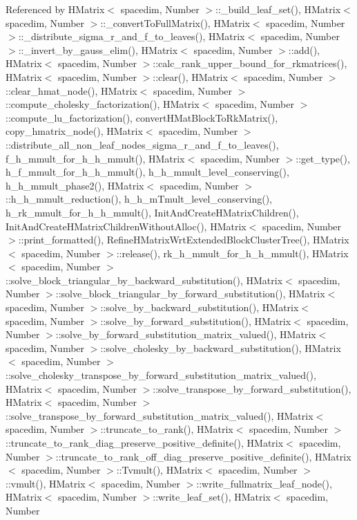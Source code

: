 Referenced by H\+Matrix$<$ spacedim, Number $>$\+::\+\_\+build\+\_\+leaf\+\_\+set(), H\+Matrix$<$ spacedim, Number $>$\+::\+\_\+convert\+To\+Full\+Matrix(), H\+Matrix$<$ spacedim, Number $>$\+::\+\_\+distribute\+\_\+sigma\+\_\+r\+\_\+and\+\_\+f\+\_\+to\+\_\+leaves(), H\+Matrix$<$ spacedim, Number $>$\+::\+\_\+invert\+\_\+by\+\_\+gauss\+\_\+elim(), H\+Matrix$<$ spacedim, Number $>$\+::add(), H\+Matrix$<$ spacedim, Number $>$\+::calc\+\_\+rank\+\_\+upper\+\_\+bound\+\_\+for\+\_\+rkmatrices(), H\+Matrix$<$ spacedim, Number $>$\+::clear(), H\+Matrix$<$ spacedim, Number $>$\+::clear\+\_\+hmat\+\_\+node(), H\+Matrix$<$ spacedim, Number $>$\+::compute\+\_\+cholesky\+\_\+factorization(), H\+Matrix$<$ spacedim, Number $>$\+::compute\+\_\+lu\+\_\+factorization(), convert\+H\+Mat\+Block\+To\+Rk\+Matrix(), copy\+\_\+hmatrix\+\_\+node(), H\+Matrix$<$ spacedim, Number $>$\+::distribute\+\_\+all\+\_\+non\+\_\+leaf\+\_\+nodes\+\_\+sigma\+\_\+r\+\_\+and\+\_\+f\+\_\+to\+\_\+leaves(), f\+\_\+h\+\_\+mmult\+\_\+for\+\_\+h\+\_\+h\+\_\+mmult(), H\+Matrix$<$ spacedim, Number $>$\+::get\+\_\+type(), h\+\_\+f\+\_\+mmult\+\_\+for\+\_\+h\+\_\+h\+\_\+mmult(), h\+\_\+h\+\_\+mmult\+\_\+level\+\_\+conserving(), h\+\_\+h\+\_\+mmult\+\_\+phase2(), H\+Matrix$<$ spacedim, Number $>$\+::h\+\_\+h\+\_\+mmult\+\_\+reduction(), h\+\_\+h\+\_\+m\+Tmult\+\_\+level\+\_\+conserving(), h\+\_\+rk\+\_\+mmult\+\_\+for\+\_\+h\+\_\+h\+\_\+mmult(), Init\+And\+Create\+H\+Matrix\+Children(), Init\+And\+Create\+H\+Matrix\+Children\+Without\+Alloc(), H\+Matrix$<$ spacedim, Number $>$\+::print\+\_\+formatted(), Refine\+H\+Matrix\+Wrt\+Extended\+Block\+Cluster\+Tree(), H\+Matrix$<$ spacedim, Number $>$\+::release(), rk\+\_\+h\+\_\+mmult\+\_\+for\+\_\+h\+\_\+h\+\_\+mmult(), H\+Matrix$<$ spacedim, Number $>$\+::solve\+\_\+block\+\_\+triangular\+\_\+by\+\_\+backward\+\_\+substitution(), H\+Matrix$<$ spacedim, Number $>$\+::solve\+\_\+block\+\_\+triangular\+\_\+by\+\_\+forward\+\_\+substitution(), H\+Matrix$<$ spacedim, Number $>$\+::solve\+\_\+by\+\_\+backward\+\_\+substitution(), H\+Matrix$<$ spacedim, Number $>$\+::solve\+\_\+by\+\_\+forward\+\_\+substitution(), H\+Matrix$<$ spacedim, Number $>$\+::solve\+\_\+by\+\_\+forward\+\_\+substitution\+\_\+matrix\+\_\+valued(), H\+Matrix$<$ spacedim, Number $>$\+::solve\+\_\+cholesky\+\_\+by\+\_\+backward\+\_\+substitution(), H\+Matrix$<$ spacedim, Number $>$\+::solve\+\_\+cholesky\+\_\+transpose\+\_\+by\+\_\+forward\+\_\+substitution\+\_\+matrix\+\_\+valued(), H\+Matrix$<$ spacedim, Number $>$\+::solve\+\_\+transpose\+\_\+by\+\_\+forward\+\_\+substitution(), H\+Matrix$<$ spacedim, Number $>$\+::solve\+\_\+transpose\+\_\+by\+\_\+forward\+\_\+substitution\+\_\+matrix\+\_\+valued(), H\+Matrix$<$ spacedim, Number $>$\+::truncate\+\_\+to\+\_\+rank(), H\+Matrix$<$ spacedim, Number $>$\+::truncate\+\_\+to\+\_\+rank\+\_\+diag\+\_\+preserve\+\_\+positive\+\_\+definite(), H\+Matrix$<$ spacedim, Number $>$\+::truncate\+\_\+to\+\_\+rank\+\_\+off\+\_\+diag\+\_\+preserve\+\_\+positive\+\_\+definite(), H\+Matrix$<$ spacedim, Number $>$\+::\+Tvmult(), H\+Matrix$<$ spacedim, Number $>$\+::vmult(), H\+Matrix$<$ spacedim, Number $>$\+::write\+\_\+fullmatrix\+\_\+leaf\+\_\+node(), H\+Matrix$<$ spacedim, Number $>$\+::write\+\_\+leaf\+\_\+set(), H\+Matrix$<$ spacedim, Number 